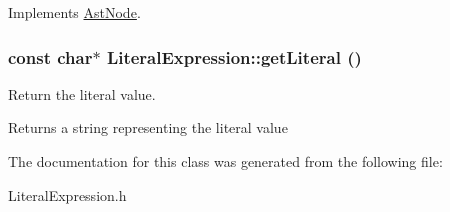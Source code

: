 Implements \hyperlink{classAstNode_a67b2d6ce1262da2954fb4db255759fb3}{AstNode}.\hypertarget{classLiteralExpression_a6e8ba5b0d9da137dfe00750cbfe125b3}{
\subsubsection[{getLiteral}]{\setlength{\rightskip}{0pt plus 5cm}const char$\ast$ LiteralExpression::getLiteral ()}}
\label{classLiteralExpression_a6e8ba5b0d9da137dfe00750cbfe125b3}
Return the literal value.

\begin{DoxyReturn}{Returns}
a string representing the literal value 
\end{DoxyReturn}


The documentation for this class was generated from the following file:\begin{DoxyCompactItemize}
\item 
LiteralExpression.h\end{DoxyCompactItemize}
